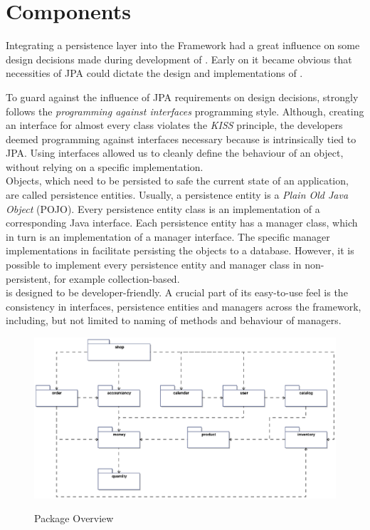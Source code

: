 \newpage
\chapter{\salespoint{} Components}
\label{chap:components}
Integrating a persistence layer into the \salespoint{} Framework had a great influence on some design decisions made during development of \salespoint{}.
Early on it became obvious that necessities of JPA could dictate the design and implementations of \salespoint{}.

To guard against the influence of JPA requirements on design decisions, \salespoint{} strongly follows the \textit{programming against interfaces} programming style.
Although, creating an interface for almost every class violates the \textit{KISS} principle, the developers deemed programming against interfaces necessary because \salespoint{} is intrinsically tied to JPA.
Using interfaces allowed us to cleanly define the behaviour of an object, without relying on a specific implementation.
\\

Objects, which need to be persisted to safe the current state of an application, are called persistence entities.
Usually, a persistence entity is a \textit{Plain Old Java Object} (POJO).
Every persistence entity class is an implementation of a corresponding Java interface.
Each persistence entity has a manager class, which in turn is an implementation of a manager interface.
The specific manager implementations in \salespoint{} facilitate persisting the objects to a database.
However, it is possible to implement every persistence entity and manager class in \salespoint{} non-persistent, for example collection-based.
\\

\salespoint{} is designed to be developer-friendly.
A crucial part of its easy-to-use feel is the consistency in interfaces, persistence entities and managers across the framework, including, but not limited to naming of methods and behaviour of managers.
\\

\begin{figure}
	\centering
  \includegraphics[width=1.0\textwidth]{images/Package_Overview.eps}
	\label{package_overview}
	\caption{Package Overview}
\end{figure}

